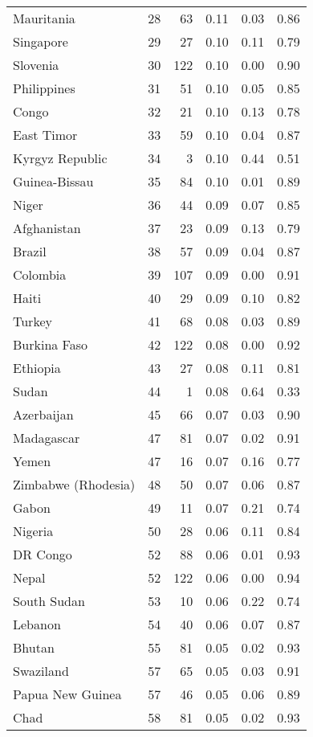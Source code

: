 \begin{longtable}[t]{lrrrrr}
Mauritania & 28 & 63 & 0.11 & 0.03 & 0.86\\
Singapore & 29 & 27 & 0.10 & 0.11 & 0.79\\
Slovenia & 30 & 122 & 0.10 & 0.00 & 0.90\\
\addlinespace
Philippines & 31 & 51 & 0.10 & 0.05 & 0.85\\
Congo & 32 & 21 & 0.10 & 0.13 & 0.78\\
East Timor & 33 & 59 & 0.10 & 0.04 & 0.87\\
Kyrgyz Republic & 34 & 3 & 0.10 & 0.44 & 0.51\\
Guinea-Bissau & 35 & 84 & 0.10 & 0.01 & 0.89\\
\addlinespace
Niger & 36 & 44 & 0.09 & 0.07 & 0.85\\
Afghanistan & 37 & 23 & 0.09 & 0.13 & 0.79\\
Brazil & 38 & 57 & 0.09 & 0.04 & 0.87\\
Colombia & 39 & 107 & 0.09 & 0.00 & 0.91\\
Haiti & 40 & 29 & 0.09 & 0.10 & 0.82\\
\addlinespace
Turkey & 41 & 68 & 0.08 & 0.03 & 0.89\\
Burkina Faso & 42 & 122 & 0.08 & 0.00 & 0.92\\
Ethiopia & 43 & 27 & 0.08 & 0.11 & 0.81\\
Sudan & 44 & 1 & 0.08 & 0.64 & 0.33\\
Azerbaijan & 45 & 66 & 0.07 & 0.03 & 0.90\\
\addlinespace
Madagascar & 47 & 81 & 0.07 & 0.02 & 0.91\\
Yemen & 47 & 16 & 0.07 & 0.16 & 0.77\\
Zimbabwe (Rhodesia) & 48 & 50 & 0.07 & 0.06 & 0.87\\
Gabon & 49 & 11 & 0.07 & 0.21 & 0.74\\
Nigeria & 50 & 28 & 0.06 & 0.11 & 0.84\\
\addlinespace
DR Congo & 52 & 88 & 0.06 & 0.01 & 0.93\\
Nepal & 52 & 122 & 0.06 & 0.00 & 0.94\\
South Sudan & 53 & 10 & 0.06 & 0.22 & 0.74\\
Lebanon & 54 & 40 & 0.06 & 0.07 & 0.87\\
Bhutan & 55 & 81 & 0.05 & 0.02 & 0.93\\
\addlinespace
Swaziland & 57 & 65 & 0.05 & 0.03 & 0.91\\
Papua New Guinea & 57 & 46 & 0.05 & 0.06 & 0.89\\
Chad & 58 & 81 & 0.05 & 0.02 & 0.93\\

\end{longtable}
